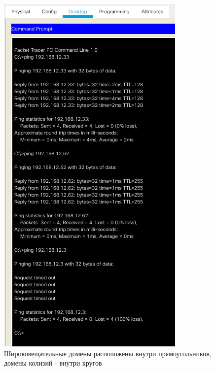 \documentclass[12pt]{report}
\begin{document}
\begin{figure}[H]
	\begin{center}
		\includegraphics[scale=0.48]{img/18.png}
	\end{center}
	\caption{Широковещательные домены расположены внутри прямоугольников, домены колизий - внутри кругов}
	\label{fig:18}
\end{figure}



	
\end{document}
